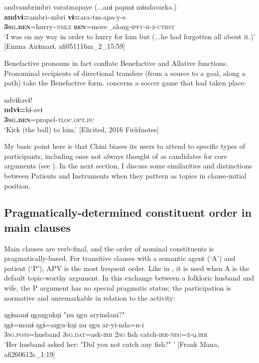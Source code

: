 \documentclass[output=paper]{langscibook}
\begin{document}
\ea\label{ex:brooks:5}
\glll andvambrimbri varatmapaye {(...anɨ papmɨ mɨndavarka.)}\\
\textbf{andvɨ=}ambri{\textasciitilde}mbri   \textbf{vɨ=}ara-tm-apa-y-e { }  \\
\textbf{\textsc{3sg.ben}}=hurry{\textasciitilde}\textsc{nmlz}  \textbf{\textsc{ben}}=move\_along-\textsc{ipfv-r-z-ctrst} { }\\
\glt `I was on my way in order to hurry for him but (...he had forgotten all about it.)' [Emma Airɨmarɨ, afi051116m\_2\_15:59]
\z


Benefactive pronouns in fact conflate Benefactive and Allative functions. Pronominal recipients of directional transfers (from a source to a goal, along a path) take the Benefactive form.  concerns a soccer game that had taken place:

\ea\label{ex:brooks:6}
\glll ndvɨkavɨ!\\
\textbf{ndvɨ=}kɨ-avɨ\\
\textbf{\textsc{3sg.ben}}=propel-\textsc{tloc.opt.pc}\\
\glt `Kick (the ball) to him.' [Elicited, 2016 Fieldnotes]
\z

 My basic point here is that Chini biases its users to attend to specific types of participants, including ones not always thought of as candidates for core arguments (see \citealt{Mithun2005}). In the next section, I discuss some similarities and distinctions between Patients and Instruments when they pattern as topics in clause-initial position.

\subsection{{Pragmatically-determined} {constituent} {order} {in} {main} {clauses}}\label{sec:brooks:2.3}

Main clauses are verb-final, and the order of nominal constituents is pragmatically-based. For transitive clauses with a semantic agent (‘A’) and patient (‘P’), APV is the most frequent order. Like in , it is used when A is the default topic-worthy argument. In this exchange between a folkloric husband and wife, the P argument has no special pragmatic status; the participation is normative and unremarkable in relation to the activity:

\ea\label{ex:brooks:7}
\glll ŋgɨmanɨ       ŋgaŋgukŋi   "nu  ŋgu  aryindani?"\\
ŋgɨ=manɨ      ŋgɨ=aŋgu-kŋi    nu  ŋgu  ar-yi-nda=n-i\\
\textsc{3sg.poss}=husband  \textsc{3sg.dat}=ask-\textsc{irr}  2\textsc{sg}  fish  catch-\textsc{irr-neg=z-q.irr}\\
 \glt `Her husband asked her: "Did you not catch any fish?" '
[Frank Mana, afi260612s\_1:19]
\z
\end{document}
